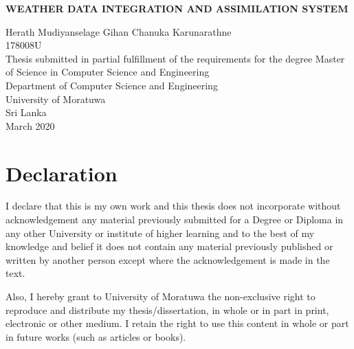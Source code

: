 \documentclass[a4paper,oneside,12pt]{report}
\begin{document}
\begin{titlepage}
    \begin{center}
        \Large{
        \textbf{WEATHER DATA INTEGRATION AND ASSIMILATION SYSTEM}}\\
        \vspace{144pt}
  \large      

        Herath Mudiyanselage Gihan Chanuka Karunarathne\\
        \vspace{24pt}
        178008U\\
         \vspace{72pt}
        \normalsize
        Thesis submitted in partial fulfillment of the requirements for the degree Master of Science in Computer Science and Engineering\\
     
       \vspace{72pt}
        \large
        Department of Computer Science and Engineering\\
        \vspace{24pt}
        University of Moratuwa\\
        Sri Lanka\\
        \vspace{32pt}
        March 2020
        
    \end{center}
\end{titlepage}


\chapter*{Declaration}

I declare that this is my own work and this thesis does not
incorporate without acknowledgement any material previously submitted for a
Degree or Diploma in any other University or institute of higher learning and to
the best of my knowledge and belief it does not contain any material previously
published or written by another person except where the acknowledgement is
made in the text.

Also, I hereby grant to University of Moratuwa the non-exclusive right to
reproduce and distribute my thesis/dissertation, in whole or in part in print,
electronic or other medium. I retain the right to use this content in whole or part
in future works (such as articles or books).
\end{document}
